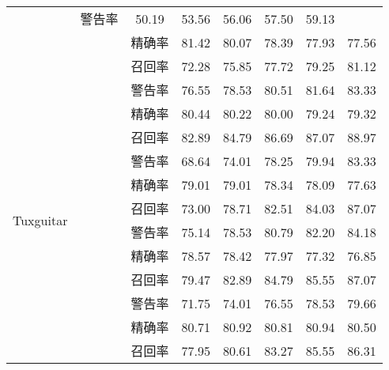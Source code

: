 \begin{table}
\begin{tabular}{cccccccc}
&    警告率       & 50.19 & 53.56 & 56.06 & 57.50 & 59.13 \\
&  & 精确率       & 81.42 & 80.07 & 78.39 & 77.93 & 77.56 \\
&             & 召回率       & 72.28 & 75.85 & 77.72 & 79.25 & 81.12 \\
\hline
\multirow{12}{*}{Tuxguitar  }
&~\multirow{3}{*}{全部(\%)}
 &   警告率       & 76.55 & 78.53 & 80.51 & 81.64 & 83.33 \\
&     & 精确率       & 80.44 & 80.22 & 80.00 & 79.24 & 79.32 \\
 &             & 召回率       & 82.89 & 84.79 & 86.69 & 87.07 & 88.97 \\
\cline{2-8}
  &~\multirow{3}{*}{无Code组      (\%)}
& 警告率       & 68.64 & 74.01 & 78.25 & 79.94 & 83.33 \\
 & & 精确率       & 79.01 & 79.01 & 78.34 & 78.09 & 77.63 \\
 &             & 召回率       & 73.00 & 78.71 & 82.51 & 84.03 & 87.07 \\
  \cline{2-8}
&~\multirow{3}{*}{无Context组(\%)}
&    警告率       & 75.14 & 78.53 & 80.79 & 82.20 & 84.18 \\
&    & 精确率       & 78.57 & 78.42 & 77.97 & 77.32 & 76.85 \\
 &             & 召回率       & 79.47 & 82.89 & 84.79 & 85.55 & 87.07 \\
\cline{2-8}
&~\multirow{3}{*}{无Evolution组 (\%)}
&    警告率       & 71.75 & 74.01 & 76.55 & 78.53 & 79.66 \\
 & & 精确率       & 80.71 & 80.92 & 80.81 & 80.94 & 80.50 \\
  &             & 召回率       & 77.95 & 80.61 & 83.27 & 85.55 & 86.31\\
\bottomrule[1.5pt]
\end{tabular}
\end{table}

